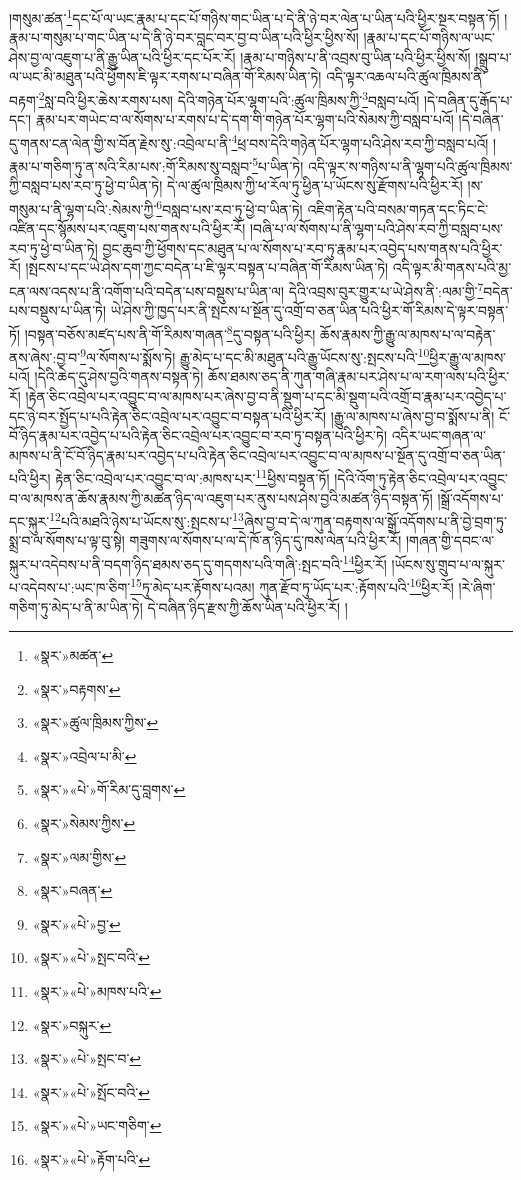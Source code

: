 །གསུམ་ཚན་\footnote{«སྣར་»མཚན་}དང་པོ་ལ་ཡང་རྣམ་པ་དང་པོ་གཉིས་གང་ཡིན་པ་དེ་ནི་ཉེ་བར་ལེན་པ་ཡིན་པའི་ཕྱིར་སྔར་བསྟན་ཏོ། །རྣམ་པ་གསུམ་པ་གང་ཡིན་པ་དེ་ནི་ཉེ་བར་བླང་བར་བྱ་བ་ཡིན་པའི་ཕྱིར་ཕྱིས་སོ། །རྣམ་པ་དང་པོ་གཉིས་ལ་ཡང་ཤེས་བྱ་ལ་འཇུག་པ་ནི་རྒྱུ་ཡིན་པའི་ཕྱིར་དང་པོར་རོ། །རྣམ་པ་གཉིས་པ་ནི་འབྲས་བུ་ཡིན་པའི་ཕྱིར་ཕྱིས་སོ། །སྒྲུབ་པ་ལ་ཡང་མི་མཐུན་པའི་ཕྱོགས་ཇི་ལྟར་རགས་པ་བཞིན་གོ་རིམས་ཡིན་ཏེ། འདི་ལྟར་འཆལ་པའི་ཚུལ་ཁྲིམས་ནི་བརྟག་\footnote{«སྣར་»བརྟགས་}སླ་བའི་ཕྱིར་ཆེས་རགས་པས། དེའི་གཉེན་པོར་ལྷག་པའི་:ཚུལ་ཁྲིམས་ཀྱི་\footnote{«སྣར་»ཚུལ་ཁྲིམས་ཀྱིས་}བསླབ་པའོ། །དེ་བཞིན་དུ་རྒོད་པ་དང་། རྣམ་པར་གཡེང་བ་ལ་སོགས་པ་རགས་པ་དེ་དག་གི་གཉེན་པོར་ལྷག་པའི་སེམས་ཀྱི་བསླབ་པའོ། །དེ་བཞིན་དུ་གནས་ངན་ལེན་གྱི་ས་བོན་རྗེས་སུ་:འབྲེལ་པ་ནི་\footnote{«སྣར་»འབྲེལ་པ་མི་}ཕྲ་བས་དེའི་གཉེན་པོར་ལྷག་པའི་ཤེས་རབ་ཀྱི་བསླབ་པའོ། །རྣམ་པ་གཅིག་ཏུ་ན་སའི་རིམ་པས་:གོ་རིམས་སུ་བསླབ་\footnote{«སྣར་»«པེ་»གོ་རིམ་དུ་བླགས་}པ་ཡིན་ཏེ། འདི་ལྟར་ས་གཉིས་པ་ནི་ལྷག་པའི་ཚུལ་ཁྲིམས་ཀྱི་བསླབ་པས་རབ་ཏུ་ཕྱེ་བ་ཡིན་ཏེ། དེ་ལ་ཚུལ་ཁྲིམས་ཀྱི་ཕ་རོལ་ཏུ་ཕྱིན་པ་ཡོངས་སུ་རྫོགས་པའི་ཕྱིར་རོ། །ས་གསུམ་པ་ནི་ལྷག་པའི་:སེམས་ཀྱི་\footnote{«སྣར་»སེམས་ཀྱིས་}བསླབ་པས་རབ་ཏུ་ཕྱེ་བ་ཡིན་ཏེ། འཇིག་རྟེན་པའི་བསམ་གཏན་དང་ཏིང་ངེ་འཛིན་དང་སྙོམས་པར་འཇུག་པས་གནས་པའི་ཕྱིར་རོ། །བཞི་པ་ལ་སོགས་པ་ནི་ལྷག་པའི་ཤེས་རབ་ཀྱི་བསླབ་པས་རབ་ཏུ་ཕྱེ་བ་ཡིན་ཏེ། བྱང་ཆུབ་ཀྱི་ཕྱོགས་དང་མཐུན་པ་ལ་སོགས་པ་རབ་ཏུ་རྣམ་པར་འབྱེད་པས་གནས་པའི་ཕྱིར་རོ། །སྤངས་པ་དང་ཡེ་ཤེས་དག་ཀྱང་བདེན་པ་ཇི་ལྟར་བསྟན་པ་བཞིན་གོ་རིམས་ཡིན་ཏེ། འདི་ལྟར་མི་གནས་པའི་མྱ་ངན་ལས་འདས་པ་ནི་འགོག་པའི་བདེན་པས་བསྡུས་པ་ཡིན་ལ། དེའི་འབྲས་བུར་གྱུར་པ་ཡེ་ཤེས་ནི་:ལམ་གྱི་\footnote{«སྣར་»ལམ་གྱིས་}བདེན་པས་བསྡུས་པ་ཡིན་ཏེ། ཡེ་ཤེས་ཀྱི་ཁྱད་པར་ནི་སྤངས་པ་སྔོན་དུ་འགྲོ་བ་ཅན་ཡིན་པའི་ཕྱིར་གོ་རིམས་དེ་ལྟར་བསྟན་ཏོ། །བསྟན་བཅོས་མཛད་པས་ནི་གོ་རིམས་གཞན་\footnote{«སྣར་»བཞན་}དུ་བསྟན་པའི་ཕྱིར། ཆོས་རྣམས་ཀྱི་རྒྱུ་ལ་མཁས་པ་ལ་བརྟེན་ནས་ཞེས་:བྱ་བ་\footnote{«སྣར་»«པེ་»བྱ་}ལ་སོགས་པ་སྨོས་ཏེ། རྒྱུ་མེད་པ་དང་མི་མཐུན་པའི་རྒྱུ་ཡོངས་སུ་:སྤངས་པའི་\footnote{«སྣར་»«པེ་»སྤང་བའི་}ཕྱིར་རྒྱུ་ལ་མཁས་པའོ། །དེའི་ཆེད་དུ་ཤེས་བྱའི་གནས་བསྟན་ཏེ། ཆོས་ཐམས་ཅད་ནི་ཀུན་གཞི་རྣམ་པར་ཤེས་པ་ལ་རག་ལས་པའི་ཕྱིར་རོ། །རྟེན་ཅིང་འབྲེལ་པར་འབྱུང་བ་ལ་མཁས་པར་ཞེས་བྱ་བ་ནི་སྡུག་པ་དང་མི་སྡུག་པའི་འགྲོ་བ་རྣམ་པར་འབྱེད་པ་དང་ཉེ་བར་སྤྱོད་པ་པའི་རྟེན་ཅིང་འབྲེལ་པར་འབྱུང་བ་བསྟན་པའི་ཕྱིར་རོ། །རྒྱུ་ལ་མཁས་པ་ཞེས་བྱ་བ་སྨོས་པ་ནི། ངོ་བོ་ཉིད་རྣམ་པར་འབྱེད་པ་པའི་རྟེན་ཅིང་འབྲེལ་པར་འབྱུང་བ་རབ་ཏུ་བསྟན་པའི་ཕྱིར་ཏེ། འདིར་ཡང་གཞན་ལ་མཁས་པ་ནི་ངོ་བོ་ཉིད་རྣམ་པར་འབྱེད་པ་པའི་རྟེན་ཅིང་འབྲེལ་པར་འབྱུང་བ་ལ་མཁས་པ་སྔོན་དུ་འགྲོ་བ་ཅན་ཡིན་པའི་ཕྱིར། རྟེན་ཅིང་འབྲེལ་པར་འབྱུང་བ་ལ་:མཁས་པར་\footnote{«སྣར་»«པེ་»མཁས་པའི་}ཕྱིས་བསྟན་ཏོ། །དེའི་འོག་ཏུ་རྟེན་ཅིང་འབྲེལ་པར་འབྱུང་བ་ལ་མཁས་ན་ཆོས་རྣམས་ཀྱི་མཚན་ཉིད་ལ་འཇུག་པར་ནུས་པས་ཤེས་བྱའི་མཚན་ཉིད་བསྟན་ཏོ། །སྒྲོ་འདོགས་པ་དང་སྐུར་\footnote{«སྣར་»བསྐུར་}པའི་མཐའི་ཉེས་པ་ཡོངས་སུ་:སྤངས་པ་\footnote{«སྣར་»«པེ་»སྤང་བ་}ཞེས་བྱ་བ་དེ་ལ་ཀུན་བརྟགས་ལ་སྒྲོ་འདོགས་པ་ནི་བྱེ་བྲག་ཏུ་སྨྲ་བ་ལ་སོགས་པ་ལྟ་བུ་སྟེ། གཟུགས་ལ་སོགས་པ་ལ་དེ་ཁོ་ན་ཉིད་དུ་ཁས་ལེན་པའི་ཕྱིར་རོ། །གཞན་གྱི་དབང་ལ་སྐུར་པ་འདེབས་པ་ནི་བདག་ཉིད་ཐམས་ཅད་དུ་གདགས་པའི་གཞི་:སྤང་བའི་\footnote{«སྣར་»«པེ་»སྤོང་བའི་}ཕྱིར་རོ། །ཡོངས་སུ་གྲུབ་པ་ལ་སྐུར་པ་འདེབས་པ་:ཡང་ཁ་ཅིག་\footnote{«སྣར་»«པེ་»ཡང་གཅིག་}ཏུ་མེད་པར་རྟོགས་པའམ། ཀུན་རྫོབ་ཏུ་ཡོད་པར་:རྟོགས་པའི་\footnote{«སྣར་»«པེ་»རྟོག་པའི་}ཕྱིར་རོ། །རེ་ཞིག་གཅིག་ཏུ་མེད་པ་ནི་མ་ཡིན་ཏེ། དེ་བཞིན་ཉིད་རྫས་ཀྱི་ཆོས་ཡིན་པའི་ཕྱིར་རོ། །
